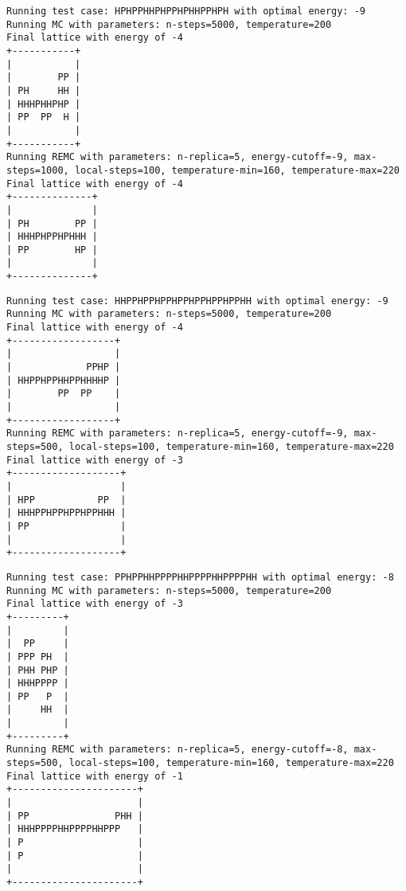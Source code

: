 \pagestyle{empty}

\begin{appendices}
    \appendixheaderon
    \singlespacing

    \begin{verbatim}
Running test case: HPHPPHHPHPPHPHHPPHPH with optimal energy: -9
Running MC with parameters: n-steps=5000, temperature=200
Final lattice with energy of -4
+-----------+
|           |
|        PP |
| PH     HH |
| HHHPHHPHP |
| PP  PP  H |
|           |
+-----------+
Running REMC with parameters: n-replica=5, energy-cutoff=-9, max-steps=1000, local-steps=100, temperature-min=160, temperature-max=220
Final lattice with energy of -4
+--------------+
|              |
| PH        PP |
| HHHPHPPHPHHH |
| PP        HP |
|              |
+--------------+
\end{verbatim}

\begin{verbatim}
Running test case: HHPPHPPHPPHPPHPPHPPHPPHH with optimal energy: -9
Running MC with parameters: n-steps=5000, temperature=200
Final lattice with energy of -4
+------------------+
|                  |
|             PPHP |
| HHPPHPPHHPPHHHHP |
|        PP  PP    |
|                  |
+------------------+
Running REMC with parameters: n-replica=5, energy-cutoff=-9, max-steps=500, local-steps=100, temperature-min=160, temperature-max=220
Final lattice with energy of -3
+-------------------+
|                   |
| HPP           PP  |
| HHHPPHPPHPPHPPHHH |
| PP                |
|                   |
+-------------------+
\end{verbatim}

\begin{verbatim}
Running test case: PPHPPHHPPPPHHPPPPHHPPPPHH with optimal energy: -8
Running MC with parameters: n-steps=5000, temperature=200
Final lattice with energy of -3
+---------+
|         |
|  PP     |
| PPP PH  |
| PHH PHP |
| HHHPPPP |
| PP   P  |
|     HH  |
|         |
+---------+
Running REMC with parameters: n-replica=5, energy-cutoff=-8, max-steps=500, local-steps=100, temperature-min=160, temperature-max=220
Final lattice with energy of -1
+----------------------+
|                      |
| PP               PHH |
| HHHPPPPHHPPPPHHPPP   |
| P                    |
| P                    |
|                      |
+----------------------+
\end{verbatim}


\end{appendices}
